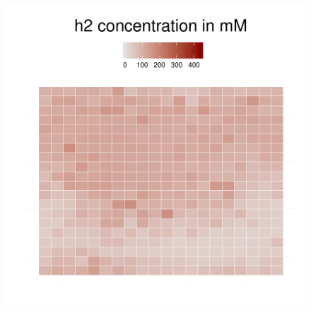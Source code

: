 \begin{figure}[h!]
{\begin{minipage}[t]{0.3\textwidth}
  \end{minipage}
  \begin{minipage}[t]{0.3\textwidth}
    \includegraphics[width=\textwidth]{../results/beijerinckii_20x20_seed943_h245.pdf}
  \end{minipage}
  }
\end{figure}
